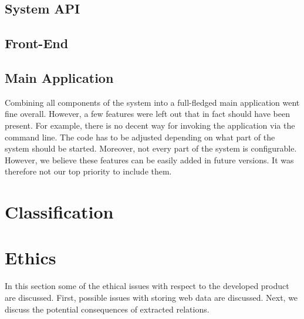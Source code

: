 \subsection{System API}
\subsection{Front-End}

\subsection{Main Application}
Combining all components of the system into a full-fledged main application went fine overall. However, a few features were left out that in fact should have been present. For example, there is no decent way for invoking the application via the command line. The code has to be adjusted depending on what part of the system should be started. Moreover, not every part of the system is configurable. However, we believe these features can be easily added in future versions. It was therefore not our top priority to include them.



\section{Classification} \label{sec:discuss-classifier}

\section{Ethics}
In this section some of the ethical issues with respect to the developed product are discussed. First, possible issues with storing web data are discussed. Next, we discuss the potential consequences of extracted relations.

